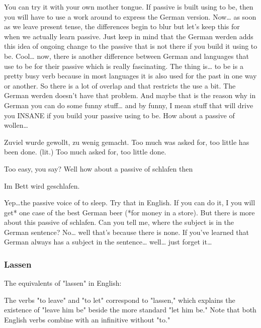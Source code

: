 \documentclass[a4paper,12pt]{article}
\begin{document}
\begin{adjustwidth}{2em}{0pt}
\begin{adjustwidth}{3em}{0pt}
You can try it with your own mother tongue. If passive is built using to be,
then you will have to use a work around to express the German version. Now… as
soon as we leave present tense, the differences begin to blur but let’s keep
this for when we actually learn passive. Just keep in mind that the German
werden adds this idea of ongoing change to the passive that is not there if you
build it using to be.  Cool… now, there is another difference between German and
languages that use to be for their passive which is really fascinating.  The
thing is… to be is a pretty busy verb because in most languages it is also used
for the past in one way or another. So there is a lot of overlap and that
restricts the use a bit. The German werden doesn’t have that problem.  And maybe
that is the reason why in German you can do some funny stuff… and by funny, I
mean stuff that will drive you INSANE if you build your passive using to be.
How about a passive of wollen…

    Zuviel wurde gewollt, zu wenig gemacht.
    Too much was asked for, too little has been done. (lit.)
    Too much asked for, too little done.

Too easy, you say? Well how about a passive of schlafen then

    Im Bett wird geschlafen.

Yep…the passive voice of to sleep. Try that in English. If you can do it, I you will get* one case of the best German beer (*for money in a store).
But there is more about this passive of schlafen.  Can you tell me, where the subject is in the German sentence? No… well that’s because there is none. If you’ve learned that German always has a subject in the sentence… well… just forget it…




\end{adjustwidth}

\subsubsection{Lassen}
\begin{adjustwidth}{3em}{0pt}
\label{sec:lassen}

The equivalents of "lassen" in English:

The verbs "to leave" and "to let" correspond to "lassen," which explains the existence of "leave him be" beside the more standard "let him be." Note that both English verbs combine with an infinitive without "to."


\end{adjustwidth}
\end{adjustwidth}
\end{document}
